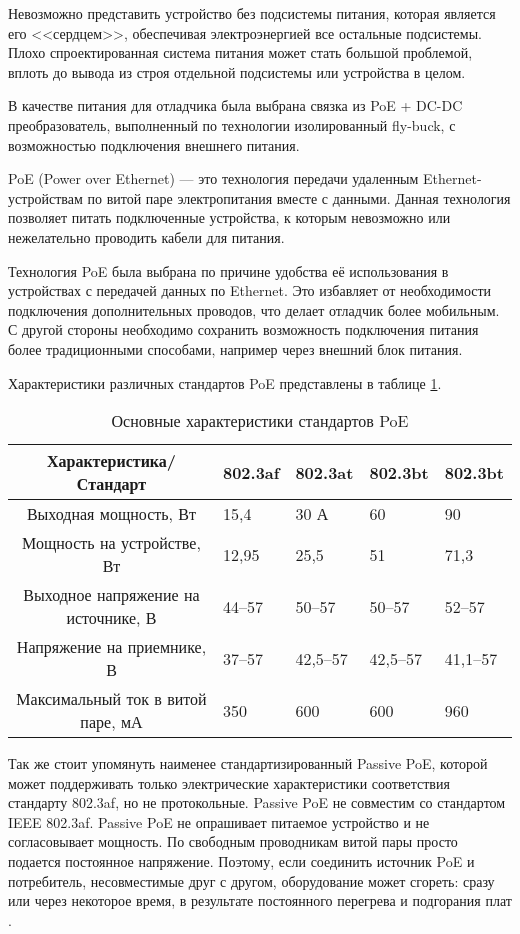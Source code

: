 Невозможно представить устройство без подсистемы питания, которая является его <<сердцем>>,
обеспечивая электроэнергией все остальные подсистемы. Плохо спроектированная система питания
может стать большой проблемой, вплоть до вывода из строя отдельной подсистемы или устройства
в целом.

В качестве питания для отладчика была выбрана связка из PoE + DC-DC преобразователь, 
выполненный по технологии изолированный fly-buck, с возможностью подключения внешнего питания. 

PoE (Power over Ethernet) — это технология передачи удаленным Ethernet-устройствам по 
витой паре электропитания вместе с данными. Данная технология позволяет питать подключенные 
устройства, к которым невозможно или нежелательно проводить кабели для питания.

Технология PoE была выбрана по причине  удобства её использования в устройствах с передачей
данных по Ethernet. Это избавляет от необходимости подключения дополнительных проводов, что
делает отладчик более мобильным. С другой стороны необходимо сохранить возможность подключения
питания более традиционными способами, например через внешний блок питания.

Характеристики различных стандартов PoE представлены в таблице \ref{PoE}.

\begin{table}[H]
    \caption{Основные характеристики стандартов PoE} 
    \label{PoE}
    \begin{center}
    \begin{tabular}{|c|p{2cm}|p{2cm}|p{2cm}|p{2cm}|}
    \hline
  Характеристика/Стандарт & 802.3af  &  802.3at   & 802.3bt & 802.3bt \\ \hline
    Выходная мощность, Вт & 15,4  & 30 А & 60 &  90 \\ \hline
    Мощность на устройстве, Вт & 12,95 & 25,5 & 51 & 71,3  \\ \hline
    Выходное напряжение на источнике, В & 44--57 & 50--57 & 50--57 & 52--57 \\ \hline
    Напряжение на приемнике, В & 37--57 & 42,5--57 & 42,5--57 & 41,1--57  \\ \hline
    Максимальный ток в витой паре, мА & 350 & 600 & 600 & 960  \\ \hline
    \end{tabular}
    \end{center}
\end{table} 

Так же стоит упомянуть наименее стандартизированный Passive PoE, которой может поддерживать только 
электрические характеристики соответствия стандарту 802.3af, но не протокольные. Passive PoE не 
совместим со стандартом IEEE 802.3af. Passive PoE не опрашивает питаемое устройство и не согласовывает
мощность. По свободным проводникам витой пары просто подается постоянное напряжение. Поэтому, 
если соединить источник PoE и потребитель, несовместимые друг с другом, оборудование может сгореть: 
сразу или через некоторое время, в результате постоянного перегрева и подгорания плат 
\cite{DeterminationPoE}.

